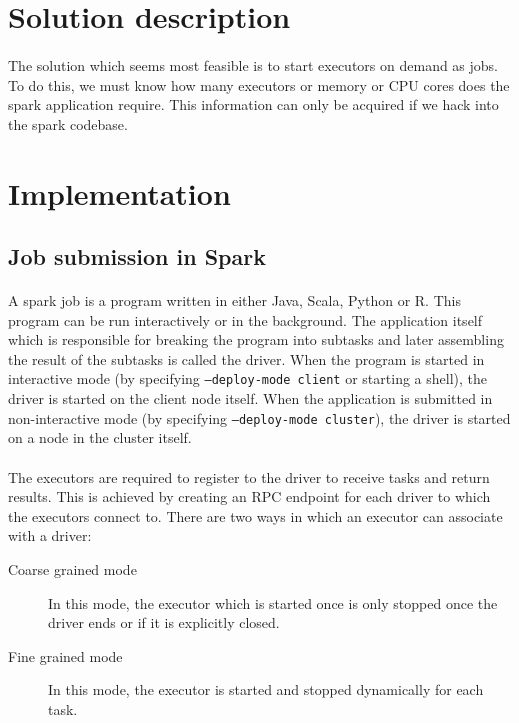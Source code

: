 \section{Solution description}

\paragraph{}
The solution which seems most feasible is to start \glspl{executor} on
demand as  jobs. To do this, we must know how many executors or
memory or CPU cores does the spark application require. This information can
only be acquired if we hack into the \gls{spark} codebase.


\section{Implementation}

\subsection{Job submission in Spark}
\paragraph{}
A \gls{spark} job is a program written in either Java, Scala, Python or R. This
program can be run interactively or in the background. The application itself
which is responsible for breaking the program into subtasks and later assembling
the result of the subtasks is called the \gls{driver}. When the program is
started in interactive mode (by specifying \texttt{--deploy-mode client} or
starting a shell), the driver is started on the client node itself. When the
application is submitted in non-interactive mode (by specifying
\texttt{--deploy-mode cluster}), the driver is started on a node in the cluster
itself.

\paragraph{}
The \glspl{executor} are required to register to the \gls{driver} to
receive tasks and return results. This is achieved by creating an RPC endpoint
for each \gls{driver} to which the \glspl{executor} connect to. There are
two ways in which an \gls{executor} can associate with a
\gls{driver}:
\begin{description}
    \item[Coarse grained mode] In this mode, the \gls{executor} which is started
        once is only stopped once the \gls{driver} ends or if it is explicitly
        closed.
    \item[Fine grained mode] In this mode, the \gls{executor} is started and
        stopped dynamically for each task.
\end{description}


